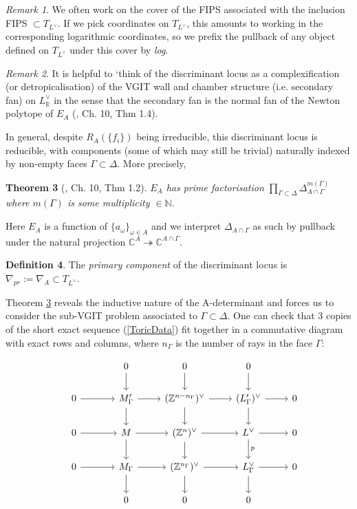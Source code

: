 \documentclass[a4paper]{article}
\theoremstyle{plain}
\newtheorem{thm}{Theorem}[section]
\theoremstyle{definition}
\newtheorem{df}[thm]{Definition}
\theoremstyle{remark}
\newtheorem{rem}[thm]{Remark}
\begin{document}
\begin{rem}
We often work on the cover of the FIPS associated with the inclusion FIPS $\subset T_{L^{\vee}}$. If we pick coordinates on $T_{L^{\vee}}$, this amounts to working in the corresponding logarithmic coordinates, so we prefix the pullback of any object defined on $T_{L^{\vee}}$ under this cover by \textit{log}.
\end{rem}

\begin{rem}
It is helpful to `think of the discriminant locus as a complexification (or detropicalisation) of the VGIT wall and chamber structure (i.e. secondary fan) on $L^{\vee}_{\mathbb{R}}$ in the sense that the secondary fan is the normal fan of the Newton polytope of $E_A$ (\cite{GKZ}, Ch. 10, Thm 1.4).
\end{rem}

In general, despite $R_A(\{f_i\})$ being irreducible, this discriminant locus is reducible, with components (some of which may still be trivial) naturally indexed by non-empty faces $\Gamma \subset \Delta$. More precisely, 
\begin{thm} [\cite{GKZ}, Ch. 10, Thm 1.2] $E_A$ has prime factorisation $\prod_{\Gamma \subset \Delta} \Delta_{A \cap \Gamma}^{m(\Gamma)}$ where $m(\Gamma)$ is some multiplicity $\in \mathbb{N}$.
\label{Factor}
\end{thm}
Here $E_A$ is a function of $\{a_{\omega}\}_{\omega \in A}$ and we interpret $\Delta_{A \cap \Gamma}$ as such by pullback under the natural projection $\mathbb{C}^A \twoheadrightarrow \mathbb{C}^{A \cap \Gamma}$. 

\begin{df}
The \textit{primary component} of the discriminant locus is $\nabla_{pr}:=\nabla_A \subset T_{L^{\vee}}$. 
\label{Pr}
\end{df}

Theorem \ref{Factor} reveals the inductive nature of the A-determinant and forces us to consider the sub-VGIT problem associated to $\Gamma \subset \Delta$. One can check that 3 copies of the short exact sequence (\ref{ToricData}) fit together in a commutative diagram with exact rows and columns, where $n_{\Gamma}$ is the number of rays in the face $\Gamma$:



\begin{equation}
\begin{tikzcd}
\hspace{1cm} & 0 \arrow{d}   & 0 \arrow{d} & 0 \arrow{d} &  \\
0 \arrow{r} & M_{\Gamma}'  \arrow{d} \arrow{r} & (\mathbb{Z}^{n-n_{\Gamma}})^{\vee} \arrow{d} \arrow{r}  & (L'_{\Gamma})^{\vee} \arrow{d} \arrow{r}  & 0  \\
0 \arrow{r} & M \arrow{d} \arrow{r} & (\mathbb{Z}^n)^{\vee} \arrow{d} \arrow{r} & L^{\vee} \arrow{d}{p} \arrow{r} & 0 \\
0 \arrow{r} & M_{\Gamma} \arrow{d} \arrow{r} & (\mathbb{Z}^{n_{\Gamma}})^{\vee} \arrow{d} \arrow{r} & L_{\Gamma}^{\vee} \arrow{d} \arrow{r} & 0 \\	
 & 0 & 0 & 0 &   
\end{tikzcd}
\label{CommSquare}
\end{equation}
\end{document}
